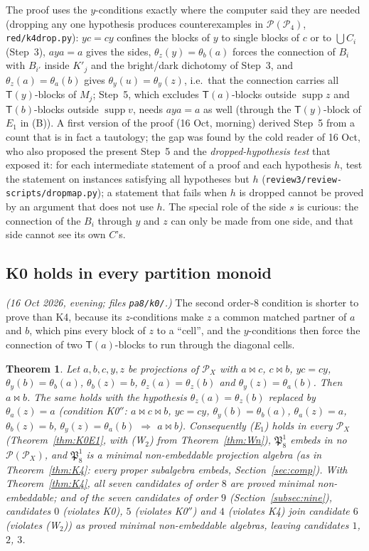 \documentclass[11pt]{amsart}
\newtheorem{theorem}{Theorem}[section]
\theoremstyle{definition}
\renewcommand{\P}{\mathcal{P}}
\newcommand{\supp}{\operatorname{supp}}
\newcommand{\T}{\mathsf{T}}
\newcommand{\mt}{\bowtie}   %
\begin{document}
The proof uses the $y$-conditions exactly where the computer said they are needed (dropping any one hypothesis produces counterexamples in $\P(\P_4)$, \texttt{red/k4drop.py}): $yc=cy$ confines the blocks of $y$ to single blocks of $c$ or to $\bigcup C_i$ (Step~3), $aya=a$ gives the sides, $\theta_z(y)=\theta_b(a)$ forces the connection of $B_i$ with $B_{i'}$ inside $K'_j$ and the bright/dark dichotomy of Step~3, and $\theta_z(a)=\theta_a(b)$ gives $\theta_y(u)=\theta_y(z)$, i.e.\ that the connection carries all $\T(y)$-blocks of $M_j$; Step~5, which excludes $\T(a)$-blocks outside $\supp z$ and $\T(b)$-blocks outside $\supp v$, needs $aya=a$ as well (through the $\T(y)$-block of $E_1$ in (B)). A first version of the proof (16 Oct, morning) derived Step~5 from a count that is in fact a tautology; the gap was found by the cold reader of 16 Oct, who also proposed the present Step~5 and the \emph{dropped-hypothesis test} that exposed it: for each intermediate statement of a proof and each hypothesis $h$, test the statement on instances satisfying all hypotheses but $h$ (\texttt{review3/review-scripts/dropmap.py}); a statement that fails when $h$ is dropped cannot be proved by an argument that does not use $h$. The special role of the side $s$ is curious: the connection of the $B_i$ through $y$ and $z$ can only be made from one side, and that side cannot see its own $C$'s.

\subsection{K0 holds in every partition monoid}\label{subsec:K0}

\emph{(16 Oct 2026, evening; files \texttt{pa8/k0/}.)} The second order-$8$ condition is shorter to prove than K4, because its $z$-conditions make $z$ a common matched partner of $a$ and $b$, which pins every block of $z$ to a ``cell'', and the $y$-conditions then force the connection of two $\T(a)$-blocks to run through the diagonal cells.

\begin{theorem}\label{thm:K0}
Let $a,b,c,y,z$ be projections of $\P_X$ with $a\mt c$, $c\mt b$, $yc=cy$, $\theta_y(b)=\theta_b(a)$, $\theta_b(z)=b$, $\theta_z(a)=\theta_z(b)$ and $\theta_y(z)=\theta_a(b)$. Then $a\mt b$. The same holds with the hypothesis $\theta_z(a)=\theta_z(b)$ replaced by $\theta_a(z)=a$ (condition \textup{K0$''$}: $a\mt c\mt b$, $yc=cy$, $\theta_y(b)=\theta_b(a)$, $\theta_a(z)=a$, $\theta_b(z)=b$, $\theta_y(z)=\theta_a(b)$ $\Rightarrow$ $a\mt b$). Consequently \textup{(E$_1$)} holds in every $\P_X$ (Theorem~\ref{thm:K0E1}, with (W$_2$) from Theorem~\ref{thm:Wn}), $\mathfrak P_8^1$ embeds in no $\P(\P_X)$, and $\mathfrak P_8^1$ is a minimal non-embeddable projection algebra (as in Theorem~\ref{thm:K4}: every proper subalgebra embeds, Section~\ref{sec:comp}). With Theorem~\ref{thm:K4}, all seven candidates of order $8$ are proved minimal non-embeddable; and of the seven candidates of order $9$ (Section~\ref{subsec:nine}), candidates $0$ (violates K0), $5$ (violates K0$''$) and $4$ (violates K4) join candidate $6$ (violates (W$_2$)) as proved minimal non-embeddable algebras, leaving candidates $1$, $2$, $3$.
\end{theorem}
\end{document}
